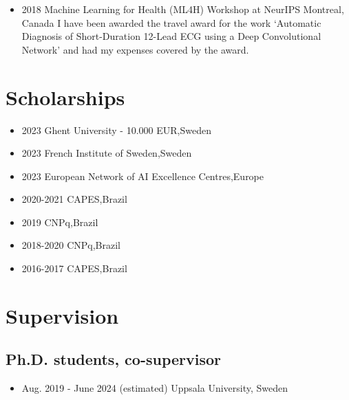 \documentclass[10pt,A4]{article} %
\begin{document}
\begin{itemize}
    \item {}
    { 2018 }
    { Machine Learning for Health (ML4H) Workshop at NeurIPS }
    { Montreal, Canada }
    { I have been awarded the travel award for the work `Automatic Diagnosis of Short-Duration 12-Lead ECG using a Deep Convolutional Network' and had my expenses covered by the award. }

\end{itemize}
  
\section{Scholarships}

\begin{itemize}

    \item {}
    { 2023 }
    { Ghent University - 10.000 EUR,Sweden }
    {  }

    \item {}
    { 2023 }
    { French Institute of Sweden,Sweden }
    {  }

    \item {}
    { 2023 }
    { European Network of AI Excellence Centres,Europe }
    {  }

    \item {}
    { 2020-2021 }
    { CAPES,Brazil }
    {  }

    \item {}
    { 2019 }
    { CNPq,Brazil }
    {  }

    \item {}
    { 2018-2020 }
    { CNPq,Brazil }
    {  }

    \item {}
    { 2016-2017 }
    { CAPES,Brazil }
    {  }

\end{itemize}

\section{Supervision}


  \subsection{\noindent Ph.D.  students, co-supervisor  }
  \begin{itemize}
    
        \item {}
        { Aug. 2019 - June 2024 (estimated) }
        { Uppsala University, Sweden }
        {  }
     
  \end{itemize}
\end{document}
